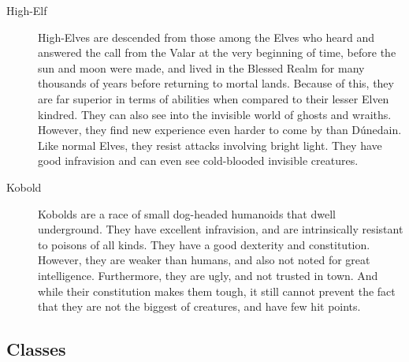 \begin{description}
\item[High-Elf] High-Elves are descended from those among the Elves who heard
     and answered the call from the Valar at the very beginning of
     time, before the sun and moon were made, and lived in the
     Blessed Realm for many thousands of years before returning to
     mortal lands. Because of this, they are far superior in terms
     of abilities when compared to their lesser Elven kindred. They
     can also see into the invisible world of ghosts and wraiths.
     However, they find new experience even harder to come by than
     D\'{u}nedain. Like normal Elves, they resist attacks involving
     bright light. They have good infravision and can even see
     cold-blooded invisible creatures.

\item[Kobold] Kobolds are a race of small dog-headed humanoids that dwell
     underground. They have excellent infravision, and are
     intrinsically resistant to poisons of all kinds. They have
     a good dexterity and constitution. However, they are
     weaker than humans, and also not noted for great
     intelligence. Furthermore, they are ugly, and not
     trusted in town. And while their constitution makes them
     tough, it still cannot prevent the fact that they are not the
     biggest of creatures, and have few hit points.
\end{description}

\subsection{Classes}
